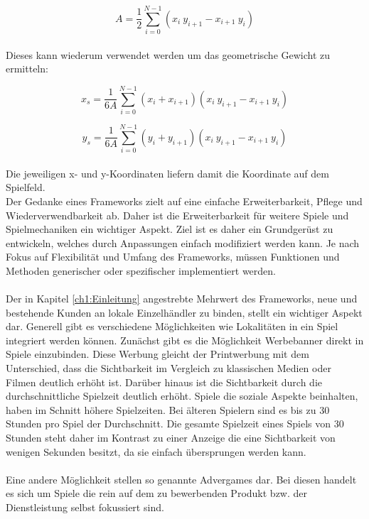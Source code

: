 \begin{equation}
A = \frac{1}{2}\sum_{i=0}^{N-1} (x_i\ y_{i+1} - x_{i+1}\ y_i)
\end{equation}
\\
Dieses kann wiederum verwendet werden um das geometrische Gewicht zu ermitteln:

\begin{equation}
x_s = \frac{1}{6A}\sum_{i=0}^{N-1}(x_i+x_{i+1})(x_i\ y_{i+1} - x_{i+1}\ y_i)
\end{equation}

\begin{equation}
y_s = \frac{1}{6A}\sum_{i=0}^{N-1}(y_i+y_{i+1})(x_i\ y_{i+1} - x_{i+1}\ y_i)
\end{equation}
\\
Die jeweiligen x- und y-Koordinaten liefern damit die Koordinate auf dem Spielfeld.
\\
Der Gedanke eines Frameworks zielt auf eine einfache Erweiterbarkeit, Pflege und Wiederverwendbarkeit ab. Daher ist die Erweiterbarkeit für weitere Spiele und Spielmechaniken ein wichtiger Aspekt.
Ziel ist es daher ein Grundgerüst zu entwickeln, welches durch Anpassungen einfach modifiziert werden kann.
Je nach Fokus auf Flexibilität und Umfang des Frameworks, müssen Funktionen und Methoden generischer oder spezifischer implementiert werden.
\\\\
Der in Kapitel \ref{ch1:Einleitung} angestrebte Mehrwert des Frameworks, neue und bestehende Kunden an lokale Einzelhändler zu binden, stellt ein wichtiger Aspekt dar. Generell gibt es verschiedene Möglichkeiten wie Lokalitäten in ein Spiel integriert werden können.\cite{Nelson.2002}
Zunächst gibt es die Möglichkeit Werbebanner direkt in Spiele einzubinden.\cite{Nelson.2004} Diese Werbung gleicht der Printwerbung mit dem Unterschied, dass die Sichtbarkeit im Vergleich zu klassischen Medien oder Filmen deutlich erhöht ist.\cite{Edery.2008} Darüber hinaus ist die Sichtbarkeit durch die durchschnittliche Spielzeit deutlich erhöht. Spiele die soziale Aspekte beinhalten, haben im Schnitt höhere Spielzeiten.\cite{Ducheneaut.2006} Bei älteren Spielern sind es bis zu 30 Stunden pro Spiel der Durchschnitt. Die gesamte Spielzeit eines Spiels von 30 Stunden steht daher im Kontrast zu einer Anzeige  die eine Sichtbarkeit von wenigen Sekunden besitzt, da sie einfach übersprungen werden kann.
\\\\
Eine andere Möglichkeit stellen so genannte Advergames dar. Bei diesen handelt es sich um Spiele die rein auf dem zu bewerbenden Produkt bzw. der Dienstleistung selbst fokussiert sind.
